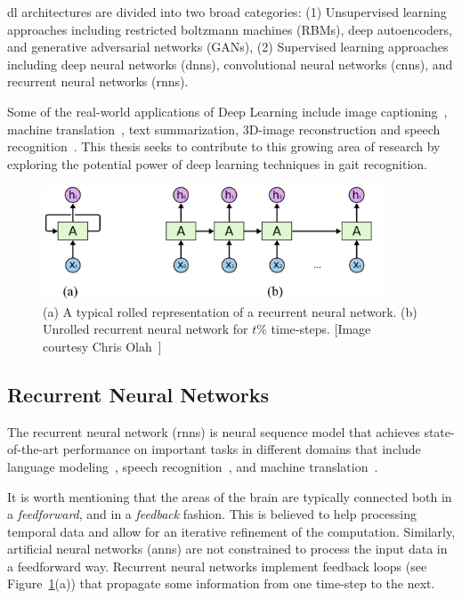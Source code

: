 \gls{dl} architectures are divided into two broad categories: (1) Unsupervised learning approaches including restricted boltzmann machines (RBMs), deep autoencoders, and generative adversarial networks (GANs), (2) Supervised learning approaches including deep neural networks (\gls{dnn}s), convolutional neural networks (\gls{cnn}s), and recurrent neural networks (\gls{rnn}s).

Some of the real-world applications of Deep Learning include image captioning~\cite{Mao_15}, machine translation~\cite{kal_13}, text summarization, 3D-image reconstruction and speech recognition~\cite{graves_13}. This thesis seeks to contribute to this growing area of research by exploring the potential power of deep learning techniques in gait recognition. 


\begin{figure}[t]
	\centering
	\includegraphics[width=0.9\textwidth]{figures/RNN_unrolled.pdf}
	\caption[A typical rolled representation of a recurrent neural network]
	{(a) A typical rolled representation of a recurrent neural network. (b) Unrolled recurrent neural network for $t$\% time-steps. [Image courtesy Chris Olah~\cite{colah_15}]\label{fig:RNN_unrolled}}
\end{figure}

\subsection{Recurrent Neural Networks} 
The recurrent neural network (\gls{rnn}s) is neural sequence model that achieves state-of-the-art performance on important tasks in different domains that include language modeling~\cite{mikolov_12}, speech recognition~\cite{graves_13}, and machine translation~\cite{kal_13}.  

It is worth mentioning that the areas of the brain are typically connected both in a \emph{feedforward}, and in a \emph{feedback} fashion. This is believed to help processing temporal data and allow for an iterative refinement of the computation. Similarly, artificial neural networks (\gls{ann}s) are not constrained to process the input data in a feedforward way. Recurrent neural networks implement feedback loops (see Figure~\ref{fig:RNN_unrolled}(a)) that propagate some information from one time-step to the next. 

